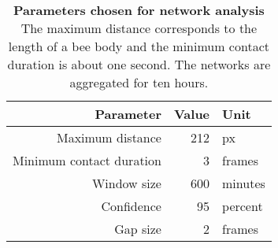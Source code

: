 \begin{table}[tbp]
\small
\centering
\caption[Parameters chosen for network analysis]{\textbf{Parameters chosen for network analysis} The maximum distance corresponds to the length of a bee body and the minimum contact duration is about one second. The networks are aggregated for ten hours.\\
}
\label{tab:chosenparams}

\begin{tabular}{rrl}
	\toprule
	\textbf{Parameter} & \textbf{Value} & \textbf{Unit} \\ \midrule
	Maximum distance & 212 & px \\
	Minimum contact duration & 3 & frames \\
	Window size & 600 & minutes \\ \midrule
	Confidence & 95 & percent \\
	Gap size & 2 & frames \\
	\bottomrule
\end{tabular}

\end{table}